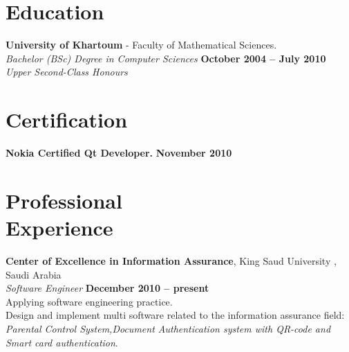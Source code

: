 \documentclass[margin,line]{resume}
\begin{document}
\begin{resume}
    \section{\mysidestyle Education}

    \textbf{University of Khartoum} - Faculty of Mathematical Sciences. \vspace{2mm}\\\vspace{1mm}%
    \textsl{Bachelor (BSc) Degree in Computer Sciences} \hfill \textbf{ October 2004 -- July 2010} \\%
    \textsl{Upper Second-Class Honours}\vspace{-3mm}\\\vspace{-1mm}%

    \section{\mysidestyle Certification}

    \textbf{Nokia Certified Qt Developer.} \hfill \textbf{November 2010} \vspace{-3mm}\\\vspace{-1mm}%

    \section{\mysidestyle Professional\\Experience}

    \textbf{Center of Excellence in Information Assurance}, King Saud University , Saudi Arabia \vspace{2mm}\\\vspace{1mm}%
    \textsl{Software Engineer} \hfill \textbf{December 2010 -- present}\\
    Applying software engineering practice.\\
    Design and implement multi software related to the information assurance field:\\
   \textsl{Parental Control System,Document Authentication system with QR-code and Smart card authentication}.\\


\end{resume}
\end{document}
